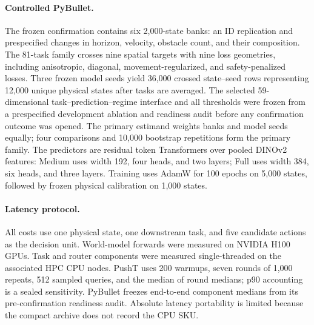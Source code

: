 \documentclass[10pt]{article}
\theoremstyle{definition}
\theoremstyle{remark}
\newcommand{\pusht}{PushT}
\newcommand{\pybullet}{PyBullet}
\begin{document}
\paragraph{Controlled \pybullet{}.}
The frozen confirmation contains six 2,000-state banks: an ID
replication and prespecified changes in horizon, velocity, obstacle count, and
their composition.  The 81-task family crosses nine spatial targets with nine
loss geometries, including anisotropic, diagonal, movement-regularized, and
safety-penalized losses.  Three frozen model seeds yield 36,000 crossed state--seed rows representing
12,000 unique physical states after tasks are averaged.  The selected
59-dimensional task--prediction--regime interface and all thresholds were
frozen from a prespecified development ablation and readiness audit before any
confirmation outcome was opened.  The primary estimand weights banks and
model seeds equally; four comparisons and 10,000 bootstrap repetitions form
the primary family.  The predictors are residual token Transformers over
pooled DINOv2 features: Medium uses width 192, four heads, and two layers;
Full uses width 384, six heads, and three layers.  Training uses AdamW for 100
epochs on 5,000 states, followed by frozen physical calibration on 1,000
states.

\begin{table}[t]
\centering
\caption{Frozen predictive computations and router interfaces.  Parameter
counts are exact for all four predictors.  The interface dimension is reported
only for the Medium-derived representation exposed to the router.}
\label{tab:models}
\small
\resizebox{\linewidth}{!}{}
\end{table}

\paragraph{Latency protocol.}
All costs use one physical state, one downstream task, and five candidate
actions as the decision unit.  World-model forwards were measured on NVIDIA
H100 GPUs.  Task and router components were measured single-threaded on the
associated HPC CPU nodes.  \pusht{} uses 200 warmups, seven rounds of 1,000
repeats, 512 sampled queries, and the median of round medians; p90 accounting
is a sealed sensitivity.  \pybullet{} freezes end-to-end component medians
from its pre-confirmation readiness audit.  Absolute latency portability is
limited because the compact archive does not record the CPU SKU.
\end{document}
